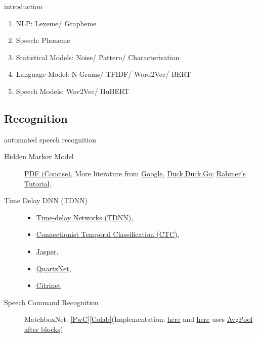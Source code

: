 \documentclass[aspectratio=169,xcolor={dvipsnames,svgnames}]{beamer}
\begin{document}
\begin{frame}[label=schedule-introduction]{introduction}
\begin{enumerate}
\item NLP: Lexeme/ Grapheme
\item Speech: Phoneme
\item Statistical Models: Noise/ Pattern/
Characterisation
\item Language Model: N-Grams/ TFIDF/ Word2Vec/ BERT
\item Speech Models: Wav2Vec/ HuBERT
\end{enumerate}
\end{frame}

\subsection{Recognition}
\label{sec:org9064009}

\begin{frame}[label=schedule-recognition]{automated speech recognition}
\begin{description}
\item[{Hidden Markov Model}] \href{https://web.stanford.edu/\~jurafsky/slp3/A.pdf}{PDF (Concise)}, More literature
from \href{https://www.google.com/search?hl=en\&q=hidden\%20markov\%20model\%20filetype\%3Apdf}{Google}, \href{https://duckduckgo.com/?q=hidden+markov+model+filetype\%3Apdf\&ia=web}{Duck,Duck,Go}; \href{https://scholar.google.com/scholar?q=A\%20tutorial\%20on\%20hidden\%20Markov\%20models\%20and\%20selected\%20applications\%20in\%20speech\%20recognition}{Rabiner’s Tutorial}.
\item[{Time Delay DNN (TDNN)}] \begin{itemize}
\item \href{./time-delay-networks/}{Time-delay Networks (TDNN)},
\item \href{./ctc/}{Connectionist Temporal Classification (CTC)},
\item \href{./jasper/}{Jasper},
\item \href{https://paperswithcode.com/paper/quartznet-deep-automatic-speech-recognition}{QuartzNet},
\item \href{https://paperswithcode.com/paper/citrinet-closing-the-gap-between-non}{Citrinet}
\end{itemize}
\item[{Speech Command Recognition}] MatchboxNet: \href{https://paperswithcode.com/paper/matchboxnet-1d-time-channel-separable-1}{[PwC]​}
\href{https://colab.research.google.com/github/tiet-ucs749/tiet-ucs749.github.io/blob/main/matchboxnet/Speech\_Commands.ipynb}{[Colab]​} (Implementation: \href{https://github.com/google-research/google-research/blob/master/kws\_streaming/models/ds\_tc\_resnet.py}{here} and \href{https://github.com/google-research/google-research/blob/master/kws\_streaming/models/xception.py}{here} uses \href{https://github.com/google-research/google-research/blob/master/kws\_streaming/models/xception.py\#L252-L266}{AvgPool
after blocks})
\end{description}
\end{frame}
\end{document}
